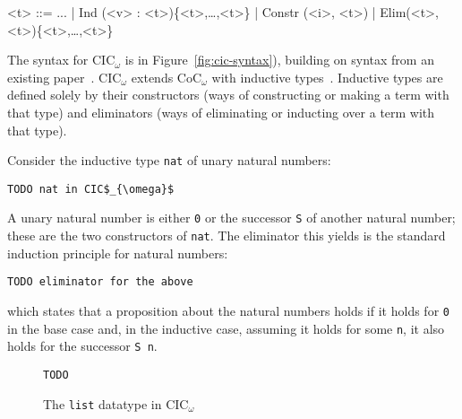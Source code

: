 \begin{figure*}
\small
\begin{grammar}
<t> ::= ... | \hspace{0.06cm} Ind (<v> : <t>)\{<t>,\ldots,<t>\} \hspace{0.06cm} | \hspace{0.06cm} Constr (<i>, <t>) \hspace{0.06cm} | \hspace{0.06cm} Elim(<t>, <t>)\{<t>,\ldots,<t>\}
\end{grammar}
\vspace{-0.3cm}
\caption{CIC$_\omega$ is CoC$_\omega$ with inductive types, inductive constructors, and primitive eliminators.}
\label{fig:cic-syntax}
\end{figure*}

The syntax for CIC$_{\omega}$ is in Figure~\ref{fig:cic-syntax}), building on syntax from an existing paper~\cite{Timany2015FirstST}.
CIC$_{\omega}$ extends CoC$_{\omega}$ with inductive types~\cite{inductive}.
Inductive types are defined solely by their constructors (ways of constructing or making a term with that type)
and eliminators (ways of eliminating or inducting over a term with that type).

Consider the inductive type \lstinline{nat} of unary natural numbers:

\begin{lstlisting}
TODO nat in CIC$_{\omega}$
\end{lstlisting}
A unary natural number is either \lstinline{0} or the successor \lstinline{S} of another natural number;
these are the two constructors of \lstinline{nat}.
The eliminator this yields is the standard induction principle for natural numbers:

\begin{lstlisting}
TODO eliminator for the above
\end{lstlisting}
which states that a proposition about the natural numbers holds if it holds for \lstinline{0} in the base case and, in the inductive case,
assuming it holds for some \lstinline{n}, it also holds for the successor \lstinline{S n}.


\begin{figure}
\begin{lstlisting}
TODO
\end{lstlisting}
\caption{The \lstinline{list} datatype in CIC$_{\omega}$}
\label{fig:list-theory}
\end{figure}

